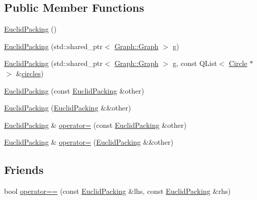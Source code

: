 \subsection*{Public Member Functions}
\begin{DoxyCompactItemize}
\item 
\hyperlink{class_circles_1_1_packing_1_1_euclid_packing_a5db8505818c5a58c8e37e501813f4b69}{Euclid\+Packing} ()
\item 
\hyperlink{class_circles_1_1_packing_1_1_euclid_packing_a23f5455e15a83f88cad6c5e79a495eb9}{Euclid\+Packing} (std\+::shared\+\_\+ptr$<$ \hyperlink{class_circles_1_1_graph_1_1_graph}{Graph\+::\+Graph} $>$ g)
\item 
\hyperlink{class_circles_1_1_packing_1_1_euclid_packing_a731f170953bccf905bcb12e79571a76f}{Euclid\+Packing} (std\+::shared\+\_\+ptr$<$ \hyperlink{class_circles_1_1_graph_1_1_graph}{Graph\+::\+Graph} $>$ g, const Q\+List$<$ \hyperlink{class_circles_1_1_packing_1_1_circle}{Circle} $\ast$ $>$ \&\hyperlink{class_circles_1_1_packing_1_1_packing_a6dec25e7a0fc0fee6e1f3fb7856a7867}{circles})
\item 
\hyperlink{class_circles_1_1_packing_1_1_euclid_packing_a7babfff0f6b3390ed698483a08dd97bf}{Euclid\+Packing} (const \hyperlink{class_circles_1_1_packing_1_1_euclid_packing}{Euclid\+Packing} \&other)
\item 
\hyperlink{class_circles_1_1_packing_1_1_euclid_packing_acf4e49f672ff5293b1c30d44637ea114}{Euclid\+Packing} (\hyperlink{class_circles_1_1_packing_1_1_euclid_packing}{Euclid\+Packing} \&\&other)
\item 
\hyperlink{class_circles_1_1_packing_1_1_euclid_packing}{Euclid\+Packing} \& \hyperlink{class_circles_1_1_packing_1_1_euclid_packing_a279dd7eadfe7bdd3a0186e5fd9a4a21e}{operator=} (const \hyperlink{class_circles_1_1_packing_1_1_euclid_packing}{Euclid\+Packing} \&other)
\item 
\hyperlink{class_circles_1_1_packing_1_1_euclid_packing}{Euclid\+Packing} \& \hyperlink{class_circles_1_1_packing_1_1_euclid_packing_ab4cb93514eb1f813c04ac86211948180}{operator=} (\hyperlink{class_circles_1_1_packing_1_1_euclid_packing}{Euclid\+Packing} \&\&other)
\end{DoxyCompactItemize}
\subsection*{Friends}
\begin{DoxyCompactItemize}
\item 
bool \hyperlink{class_circles_1_1_packing_1_1_euclid_packing_a26518eba9f5ed05fae7a39f5fe7c6f41}{operator==} (const \hyperlink{class_circles_1_1_packing_1_1_euclid_packing}{Euclid\+Packing} \&lhs, const \hyperlink{class_circles_1_1_packing_1_1_euclid_packing}{Euclid\+Packing} \&rhs)
\end{DoxyCompactItemize}
